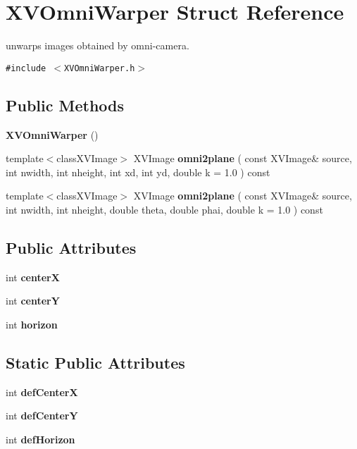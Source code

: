 \hypertarget{class_XVOmniWarper}{
\section{XVOmni\-Warper  Struct Reference}
\label{XVOmniWarper}
}
unwarps images obtained by omni-camera. 


{\tt \#include $<$XVOmni\-Warper.h$>$}

\subsection*{Public Methods}
\begin{CompactItemize}
\item 
{\bf XVOmni\-Warper} ()
\item 
\label{XVOmniWarper_a1}
\hypertarget{class_XVOmniWarper_a1}{
template$<$classXVImage$>$ XVImage {\bf omni2plane} ( const XVImage\& source, int nwidth, int nheight, int xd, int yd, double k = 1.0 ) const}

\item 
\label{XVOmniWarper_a2}
\hypertarget{class_XVOmniWarper_a2}{
template$<$classXVImage$>$ XVImage {\bf omni2plane} ( const XVImage\& source, int nwidth, int nheight, double theta, double phai, double k = 1.0 ) const}

\end{CompactItemize}
\subsection*{Public Attributes}
\begin{CompactItemize}
\item 
int {\bf center\-X}
\item 
int {\bf center\-Y}
\item 
int {\bf horizon}
\end{CompactItemize}
\subsection*{Static Public Attributes}
\begin{CompactItemize}
\item 
int {\bf def\-Center\-X}
\item 
int {\bf def\-Center\-Y}
\item 
int {\bf def\-Horizon}
\end{CompactItemize}


